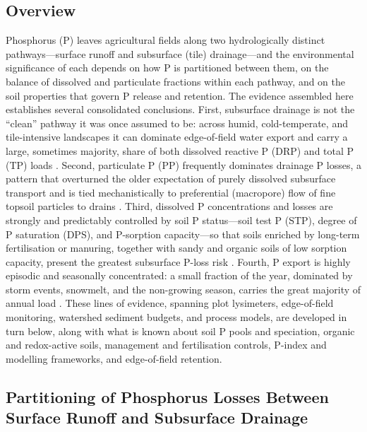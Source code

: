 \subsection{Overview}

Phosphorus (P) leaves agricultural fields along two hydrologically distinct
pathways---surface runoff and subsurface (tile) drainage---and the environmental
significance of each depends on how P is partitioned between them, on the balance
of dissolved and particulate fractions within each pathway, and on the soil
properties that govern P release and retention. The evidence assembled here
establishes several consolidated conclusions. First, subsurface drainage is not
the ``clean'' pathway it was once assumed to be: across humid, cold-temperate,
and tile-intensive landscapes it can dominate edge-of-field water export and
carry a large, sometimes majority, share of both dissolved reactive P (DRP) and
total P (TP) loads \parencite{Pease2018,VanEsbroeck2016,Qi2018,Sadhukhan2019b}.
Second, particulate P (PP) frequently dominates drainage P losses, a pattern that
overturned the older expectation of purely dissolved subsurface transport and is
tied mechanistically to preferential (macropore) flow of fine topsoil particles
to drains \parencite{Uusitalo2001,Lu2003,Laubel1999,Sims1998}. Third, dissolved P
concentrations and losses are strongly and predictably controlled by soil P
status---soil test P (STP), degree of P saturation (DPS), and P-sorption
capacity---so that soils enriched by long-term fertilisation or manuring, together
with sandy and organic soils of low sorption capacity, present the greatest
subsurface P-loss risk \parencite{Sharpley1995,Beauchemin2003,Siemens2004,Sims1998,McDowell2001b}.
Fourth, P export is highly episodic and seasonally concentrated: a small fraction
of the year, dominated by storm events, snowmelt, and the non-growing season,
carries the great majority of annual load
\parencite{King2015,VanEsbroeck2016,Brendel2019,Grant1996}. These lines of
evidence, spanning plot lysimeters, edge-of-field monitoring, watershed sediment
budgets, and process models, are developed in turn below, along with what is known
about soil P pools and speciation, organic and redox-active soils, management and
fertilisation controls, P-index and modelling frameworks, and edge-of-field
retention.

\subsection{Partitioning of Phosphorus Losses Between Surface Runoff and
Subsurface Drainage}

